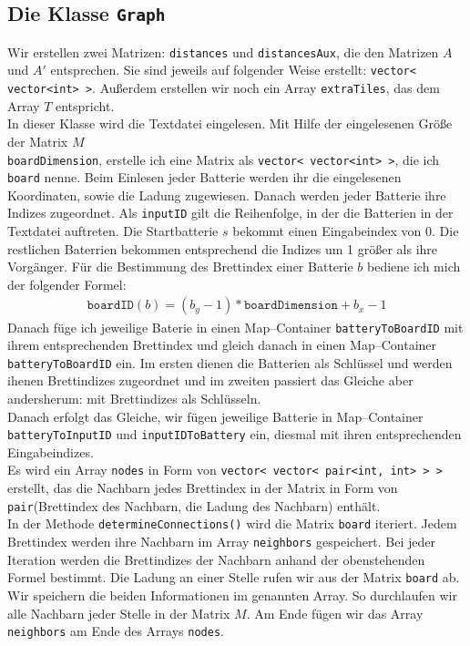 \documentclass[a4paper,10pt,ngerman]{scrartcl}
\begin{document}
\subsection{Die Klasse \texttt{Graph}}
Wir erstellen zwei Matrizen: \texttt{distances} und \texttt{distancesAux}, die den Matrizen 
$A$ und $A'$ entsprechen. Sie sind jeweils auf folgender Weise erstellt: \texttt{vector< vector<int> >}.
Außerdem erstellen wir noch ein Array \texttt{extraTiles}, das dem Array $T$ entspricht.\\

In dieser Klasse wird die Textdatei eingelesen. Mit Hilfe der eingelesenen Größe der Matrix $M$\\ \texttt{boardDimension},
erstelle ich eine Matrix als \texttt{vector< vector<int> >}, die ich \texttt{board} nenne.
Beim Einlesen jeder Batterie werden ihr die eingelesenen Koordinaten, sowie die Ladung zugewiesen.
Danach werden jeder Batterie ihre Indizes zugeordnet. Als \texttt{inputID} gilt die
Reihenfolge, in der die Batterien in der Textdatei auftreten. Die Startbatterie $s$ bekommt einen
Eingabeindex von 0. Die restlichen Baterrien bekommen entsprechend die Indizes um 1 größer als ihre Vorgänger.
Für die Bestimmung des Brettindex einer Batterie $b$ bediene ich mich der folgender Formel:
\begin{align*}
\texttt{boardID}(b) = (b_y-1) * \texttt{boardDimension} + b_x-1
\end{align*}
Danach füge ich jeweilige Baterie in einen Map--Container \texttt{batteryToBoardID} mit ihrem entsprechenden Brettindex
und gleich danach in einen Map--Container \texttt{batteryToBoardID} ein. Im ersten dienen die Batterien als Schlüssel und werden
ihenen Brettindizes zugeordnet und im zweiten passiert das Gleiche aber andersherum: mit Brettindizes als Schlüsseln.\\
Danach erfolgt das Gleiche, wir fügen jeweilige Batterie in Map--Container \texttt{batteryToInputID} und
\texttt{inputIDToBattery} ein, diesmal mit ihren entsprechenden Eingabeindizes.\\

Es wird ein Array \texttt{nodes} in Form von \texttt{vector< vector< pair<int, int> > >}
erstellt, das die Nachbarn jedes Brettindex in der Matrix in Form von 
\texttt{pair}(Brettindex des Nachbarn, die Ladung des Nachbarn) enthält.\\
In der Methode \texttt{determineConnections()} wird die Matrix \texttt{board} iteriert.
Jedem Brettindex werden ihre Nachbarn im Array \texttt{neighbors} gespeichert.
Bei jeder Iteration werden die Brettindizes der Nachbarn anhand der obenstehenden Formel bestimmt.
Die Ladung an einer Stelle rufen wir aus der Matrix \texttt{board} ab. Wir speichern die beiden Informationen
im genannten Array. So durchlaufen wir alle Nachbarn jeder Stelle in der Matrix $M$.
Am Ende fügen wir das Array \texttt{neighbors} am Ende des Arrays \texttt{nodes}.\\
\end{document}
